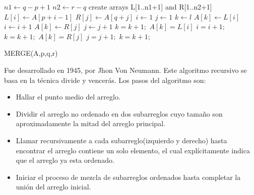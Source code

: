 \documentclass{article}
\begin{document}
                    \begin{algorithm}[H]
                        \begin{algorithmic}[1]
                            \STATE $n1 \gets q-p+1$
                            \STATE $n2 \gets r-q$
                            \STATE create arrays L[1..n1+1] and R[1..n2+1]
                                \STATE $L[i] \gets A[p+i-1]$
                            \ENDFOR
                                \STATE $R[j] \gets A[q+j]$
                            \ENDFOR
                            \STATE $i \gets 1$
                            \STATE $j \gets 1$
                            \STATE $k \gets l$
                                    \STATE $A[k] \gets L[i]$ 
                                    \STATE $i \gets i + 1$ 
                                \ELSE
                                    \STATE $A[k] \gets R[j]$ 
                                    \STATE $j \gets j + 1$
                                \ENDIF
                                \STATE $k = k + 1;$
                            \ENDWHILE
                                \STATE $A[k] = L[i]$
                                \STATE $i = i + 1;$
                                \STATE $k = k + 1;$
                            \ENDWHILE
                                \STATE $A[k] = R[j]$
                                \STATE $j = j + 1;$
                                \STATE $k = k + 1;$
                            \ENDWHILE
                        \end{algorithmic}
                        \caption{MERGE(A,p,q,r)}
                        \label{alg:merge}
                    \end{algorithm}
                     Fue desarrollado en 1945, por Jhon Von Neumann. Este algoritmo recursivo se basa en la técnica divide y vencerás.
                    Los pasos del algoritmo son:
    		        \begin{itemize}
    		            \item Hallar el punto medio del arreglo.
    		            \item Dividir el arreglo no ordenado en dos subarreglos cuyo tamaño son aproximadamente la mitad del arreglo principal.
    		            \item Llamar recursivamente a cada subarreglo(izquierdo y derecho) hasta encontrar el arreglo contiene un solo elemento, el cual explícitamente indica que el arreglo ya esta ordenado.
    		            \item Iniciar el proceso de mezcla de subarreglos ordenados hasta completar la unión del arreglo inicial.
    		        \end{itemize}
\end{document}
